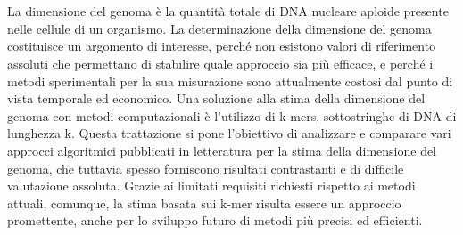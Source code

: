 \documentclass[crop=false]{standalone}
\begin{document}
	
	\chapter*{\abstractname}
		La dimensione del genoma è la quantità totale di DNA nucleare aploide presente nelle cellule di un organismo. La determinazione della dimensione del genoma costituisce un argomento di interesse, perché non esistono valori di riferimento assoluti che permettano di stabilire quale approccio sia più efficace, e perché i metodi sperimentali per la sua misurazione sono attualmente costosi dal punto di vista temporale ed economico. Una soluzione alla stima della dimensione del genoma con metodi computazionali è l'utilizzo di k-mers, sottostringhe di DNA di lunghezza k. Questa trattazione si pone l'obiettivo di analizzare e comparare vari approcci algoritmici pubblicati in letteratura per la stima della dimensione del genoma, che tuttavia spesso forniscono risultati contrastanti e di difficile valutazione assoluta. Grazie ai limitati requisiti richiesti rispetto ai metodi attuali, comunque, la stima basata sui k-mer risulta essere un approccio promettente, anche per lo sviluppo futuro di metodi più precisi ed efficienti.
		
	\cleardoublepage
\end{document}
